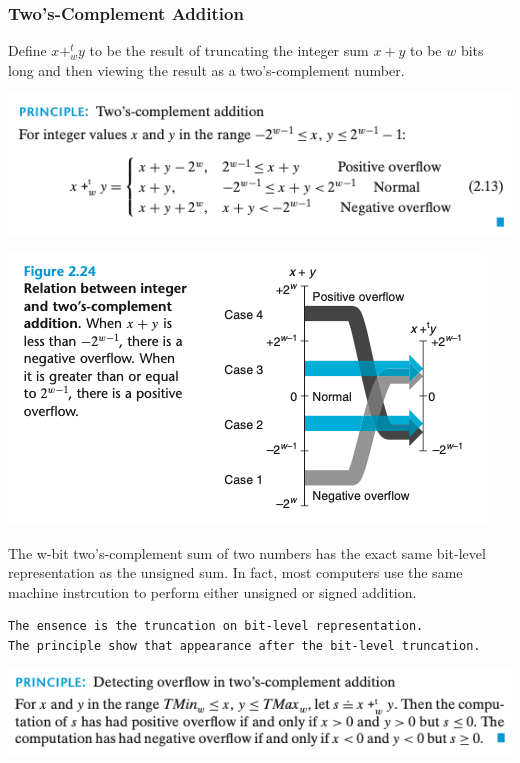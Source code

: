 \documentclass[11pt]{article}
\begin{document}
\subsubsection{Two's-Complement Addition}
\label{sec:orgec41de7}

Define \(x +_w^t y\) to be the result of truncating the integer sum \(x + y\) to be \(w\) bits long and then viewing the result as a two's-complement number.\\

\begin{center}
\includegraphics[width=.9\linewidth]{pics/two's-complement-addition.png}
\end{center}

\begin{center}
\includegraphics[width=.9\linewidth]{pics/two's-complement-addition-fig.png}
\end{center}

The w-bit two's-complement sum of two numbers has the exact same bit-level representation as the unsigned sum. In fact, most computers use the same machine instrcution to perform either unsigned or signed addition.\\


\begin{verbatim}
The ensence is the truncation on bit-level representation.
The principle show that appearance after the bit-level truncation.
\end{verbatim}


\begin{center}
\includegraphics[width=.9\linewidth]{pics/detecting-overflow-in-two's-complement-addition.png}
\end{center}
\end{document}
